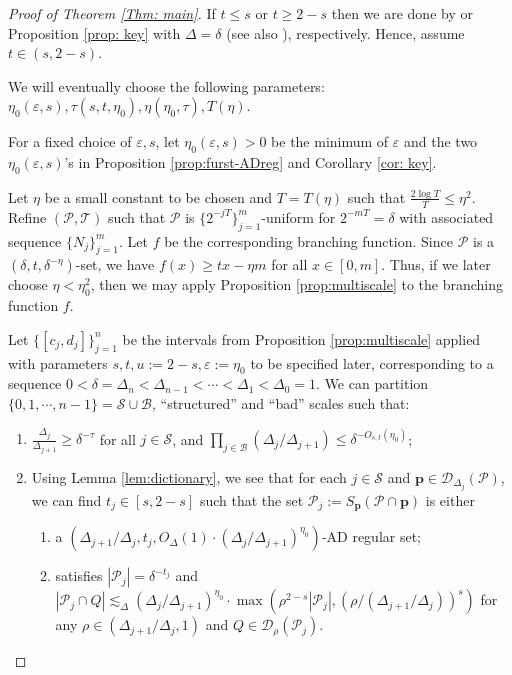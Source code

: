 \documentclass{amsart}
\newcommand{\eps}{\varepsilon}
\newcommand{\lesim}{\lesssim}
\newcommand{\bp}{\mathbf{p}}
\newcommand{\cD}{\mathcal{D}}
\newcommand{\cB}{\mathcal{B}}
\newcommand{\cS}{\mathcal{S}}
\newcommand{\cT}{\mathcal{T}}
\newcommand{\cP}{\mathcal{P}}
\begin{document}
\begin{proof}[Proof of Theorem \ref{Thm: main}]
If $t \le s$ or $t \ge 2-s$ then we are done by \cite[Corollary 2.14]{orponen2021hausdorff} or Proposition \ref{prop: key} with $\Delta = \delta$ (see also \cite[Corollary 5.28]{orponen2023projections}), respectively. Hence, assume $t \in (s, 2-s)$.

We will eventually choose the following parameters: $\eta_0 (\eps, s), \tau (s, t, \eta_0), \eta (\eta_0, \tau), T(\eta)$.

For a fixed choice of $\eps, s$, let $\eta_0 (\eps, s) > 0$ be the minimum of $\eps$ and the two $\eta_0 (\eps, s)$'s in Proposition \ref{prop:furst-ADreg} and Corollary \ref{cor: key}.

Let $\eta$ be a small constant to be chosen and  $T=T(\eta)$ such that $\frac{2\log T}{T}\leq \eta^2$. Refine $(\cP, \cT)$ such that $\cP$ is $\{2^{-jT}\}_{j=1}^m$-uniform for $2^{-mT}=\delta$ with associated sequence $\{N_j\}_{j=1}^m$. Let $f$ be the corresponding branching function. Since $\cP$ is a $(\delta, t, \delta^{-\eta})$-set, we have $f(x) \ge tx - \eta m$ for all $x \in [0, m]$. Thus, if we later choose $\eta < \eta_0^2$, then we may apply Proposition \ref{prop:multiscale} to the branching function $f$.

Let $\{ [c_j, d_j] \}_{j=1}^n$ be the intervals from Proposition \ref{prop:multiscale} applied with parameters $s, t, u := 2 - s, \eps := \eta_0$ to be specified later, corresponding to a sequence $0 < \delta = \Delta_n < \Delta_{n-1} < \cdots < \Delta_1 < \Delta_0 = 1$. We can partition $\{ 0, 1, \cdots, n-1 \} = \cS \cup \cB$, ``structured'' and ``bad'' scales such that:
    \begin{enumerate}
        \item $\frac{\Delta_{j}}{\Delta_{j+1}} \ge \delta^{-\tau}$ for all $j \in \cS$, and $\prod_{j \in \cB} (\Delta_{j}/\Delta_{j+1}) \le \delta^{-O_{s,t} (\eta_0)}$;

        \item Using Lemma \ref{lem:dictionary}, we see that for each $j \in \cS$ and $\bp \in \cD_{\Delta_j} (\cP)$, we can find $t_j \in [s, 2-s]$ such that the set $\cP_j := S_{\bp} (\cP \cap \bp)$ is either
        \begin{enumerate} 
        \item[(i)] a $(\Delta_{j+1}/\Delta_j, t_j, O_\Delta (1) \cdot (\Delta_j/ \Delta_{j+1})^{\eta_0})$-AD regular set; 
        \item[(ii)] satisfies $|\cP_j| = \delta^{-t_j}$ and $|\cP_j \cap Q| \lesim_\Delta (\Delta_j/\Delta_{j+1})^{\eta_0} \cdot \max(\rho^{2-s} |\cP_j|, (\rho/(\Delta_{j+1}/\Delta_j))^s)$ for any $\rho \in (\Delta_{j+1}/\Delta_j, 1)$ and $Q \in \cD_\rho (\cP_j)$.
        \end{enumerate}


\end{enumerate}
\end{proof}
\end{document}
